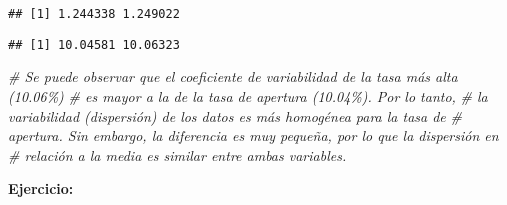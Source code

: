 \documentclass[
]{book}
\newenvironment{Shaded}{\begin{snugshade}}{\end{snugshade}}
\newcommand{\CommentTok}[1]{\textcolor[rgb]{0.56,0.35,0.01}{\textit{#1}}}
\newcommand{\DecValTok}[1]{\textcolor[rgb]{0.00,0.00,0.81}{#1}}
\newcommand{\FunctionTok}[1]{\textcolor[rgb]{0.00,0.00,0.00}{#1}}
\newcommand{\NormalTok}[1]{#1}
\newcommand{\OtherTok}[1]{\textcolor[rgb]{0.56,0.35,0.01}{#1}}
\newcommand{\SpecialCharTok}[1]{\textcolor[rgb]{0.00,0.00,0.00}{#1}}
\begin{document}
\begin{Shaded}
\end{Shaded}

\begin{verbatim}
## [1] 1.244338 1.249022
\end{verbatim}

\begin{Shaded}
\end{Shaded}

\begin{verbatim}
## [1] 10.04581 10.06323
\end{verbatim}

\begin{Shaded}
\begin{Highlighting}[]
\CommentTok{\# Se puede observar que el coeficiente de variabilidad de la tasa más alta (10.06\%)}
\CommentTok{\# es mayor a la de la tasa de apertura (10.04\%). Por lo tanto, }
\CommentTok{\# la variabilidad (dispersión) de los datos es más homogénea para la tasa de}
\CommentTok{\# apertura. Sin embargo, la diferencia es muy pequeña, por lo que la dispersión en }
\CommentTok{\# relación a la media es similar entre ambas variables.}
\end{Highlighting}
\end{Shaded}

\textbf{Ejercicio:}
\end{document}
